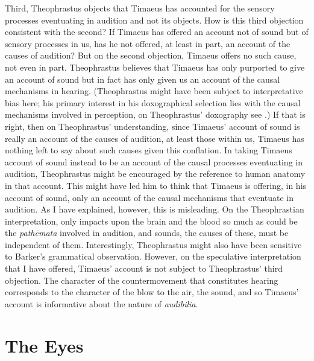 Third, Theophrastus objects that Timaeus has accounted for the sensory processes eventuating in audition and not its objects. How is this third objection consistent with the second? If Timaeus has offered an account not of sound but of sensory processes in us, has he not offered, at least in part, an account of the causes of audition? But on the second objection, Timaeus offers no such cause, not even in part. Theophrastus believes that Timaeus has only purported to give an account of sound but in fact has only given us an account of the causal mechanisms in hearing. (Theophrastus might have been subject to interpretative bias here; his primary interest in his doxographical selection lies with the causal mechanisms involved in perception, on Theophrastus' doxography see \citealt{Baltussen:1993fl,Baltussen:2000aa}.) If that is right, then on Theophrastus' understanding, since Timaeus' account of sound is really an account of the causes of audition, at least those within us, Timaeus has nothing left to say about such causes given this conflation. In taking Timaeus account of sound instead to be an account of the causal processes eventuating in audition, Theophrastus might be encouraged by the reference to human anatomy in that account. This might have led him to think that Timaeus is offering, in his account of sound, only an account of the causal mechanisms that eventuate in audition. As I have explained, however, this is misleading. On the Theophrastian interpretation, only impacts upon the brain and the blood so much as could be the \emph{pathēmata} involved in audition, and sounds, the causes of these, must be independent of them. Interestingly, Theophrastus might also have been sensitive to Barker's grammatical observation. However, on the speculative interpretation that I have offered, Timaeus' account is not subject to Theophrastus' third objection. The character of the countermovement that constitutes hearing corresponds to the character of the blow to the air, the sound, and so Timaeus' account is informative about the nature of \emph{audibilia}.


\section{The Eyes} %
\label{sec:the_eyes}

